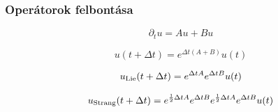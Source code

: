 \documentclass{beamer}
\begin{document}
\begin{frame}[noframenumbering]
\frametitle{Operátorok felbontása}
\begin{large}
\begin{equation*}
\partial_t u = Au+Bu
\end{equation*}

\begin{equation*}
u(t+\Delta t)=e^{\Delta t(A+B)}u(t)
\end{equation*}


\begin{equation*}
u_{\rm{Lie}}(t+\Delta t)=e^{\Delta tA}e^{\Delta tB}u(t)
\end{equation*}

\begin{equation*}
u_{\rm{Strang}}(t+\Delta t)=e^{\frac{1}{2}\Delta tA}e^{\Delta tB}e^{\frac{1}{2}\Delta tA}e^{\Delta tB}u(t)
\end{equation*}
\end{large}
\end{frame}
\end{document}

